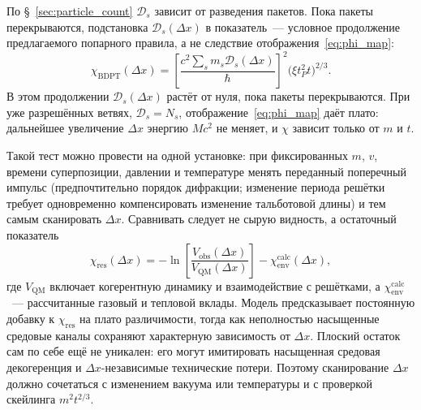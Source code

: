 \documentclass[12pt,a4paper]{article}
\begin{document}
По \S~\ref{sec:particle_count} $\mathcal D_s$ зависит от разведения пакетов. Пока пакеты перекрываются, подстановка $\mathcal D_s(\Delta x)$ в показатель~--- условное продолжение предлагаемого попарного правила, а не следствие отображения~\eqref{eq:phi_map}:
\begin{equation}
\chi_{\mathrm{BDPT}}(\Delta x)=
\left[\frac{c^2\sum_s m_s\mathcal D_s(\Delta x)}{\hbar}\right]^2
\bigl(\xi t_P^2t\bigr)^{2/3}.
\label{eq:chi_dx}
\end{equation}
В этом продолжении $\mathcal D_s(\Delta x)$ растёт от нуля, пока пакеты перекрываются. При уже разрешённых ветвях, $\mathcal D_s=N_s$, отображение~\eqref{eq:phi_map} даёт плато: дальнейшее увеличение $\Delta x$ энергию $Mc^2$ не меняет, и $\chi$ зависит только от $m$ и $t$.

Такой тест можно провести на одной установке: при фиксированных $m$, $v$, времени суперпозиции, давлении и температуре менять переданный поперечный импульс (предпочтительно порядок дифракции; изменение периода решётки требует одновременно компенсировать изменение тальботовой длины) и тем самым сканировать $\Delta x$. Сравнивать следует не сырую видность, а остаточный показатель
\begin{equation}
\chi_{\mathrm{res}}(\Delta x)=
-\ln\!\left[\frac{V_{\mathrm{obs}}(\Delta x)}{V_{\mathrm{QM}}(\Delta x)}\right]
-\chi_{\mathrm{env}}^{\mathrm{calc}}(\Delta x),
\end{equation}
где $V_{\mathrm{QM}}$ включает когерентную динамику и взаимодействие с решётками, а $\chi_{\mathrm{env}}^{\mathrm{calc}}$~--- рассчитанные газовый и тепловой вклады. Модель предсказывает постоянную добавку к $\chi_{\mathrm{res}}$ на плато различимости, тогда как неполностью насыщенные средовые каналы сохраняют характерную зависимость от $\Delta x$. Плоский остаток сам по себе ещё не уникален: его могут имитировать насыщенная средовая декогеренция и $\Delta x$-независимые технические потери. Поэтому сканирование $\Delta x$ должно сочетаться с изменением вакуума или температуры и с проверкой скейлинга $m^2t^{2/3}$.

\end{document}

